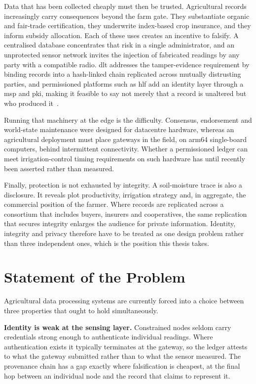 \documentclass[12pt,a4paper,oneside]{book}
\begin{document}
Data that has been collected cheaply must then be trusted. Agricultural records
increasingly carry consequences beyond the farm gate. They substantiate organic
and fair-trade certification, they underwrite index-based crop insurance, and
they inform subsidy allocation. Each of these uses creates an incentive to
falsify. A centralised database concentrates that risk in a single
administrator, and an unprotected sensor network invites the injection of
fabricated readings by any party with a compatible radio. \gls{dlt} addresses
the tamper-evidence requirement by binding records into a hash-linked chain
replicated across mutually distrusting parties, and permissioned platforms such
as \gls{hlf} add an identity layer through a \gls{msp} and \gls{pki}, making it
feasible to say not merely that a record is unaltered but who produced
it~\cite{tar2023fabric, jayaram2023hyperledger, dube2024fabricIrrigation}.

Running that machinery at the edge is the difficulty. Consensus, endorsement and
world-state maintenance were designed for datacentre hardware, whereas an
agricultural deployment must place gateways in the field, on \gls{arm64}
single-board computers, behind intermittent connectivity. Whether a permissioned
ledger can meet irrigation-control timing requirements on such hardware has
until recently been asserted rather than measured.

Finally, protection is not exhausted by integrity. A soil-moisture trace is also
a disclosure. It reveals plot productivity, irrigation strategy and, in
aggregate, the commercial position of the farmer. Where records are replicated
across a consortium that includes buyers, insurers and cooperatives, the same
replication that secures integrity enlarges the audience for private
information. Identity, integrity and privacy therefore have to be treated as one
design problem rather than three independent ones, which is the position this
thesis takes.

\section{Statement of the Problem}
\label{sec:problem}

Agricultural data processing systems are currently forced into a choice between
three properties that ought to hold simultaneously.

\textbf{Identity is weak at the sensing layer.} Constrained nodes seldom carry
credentials strong enough to authenticate individual readings. Where
authentication exists it typically terminates at the gateway, so the ledger
attests to what the gateway submitted rather than to what the sensor measured.
The provenance chain has a gap exactly where falsification is cheapest, at the
final hop between an individual node and the record that claims to represent
it.
\end{document}

